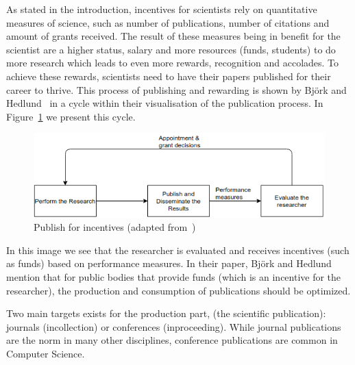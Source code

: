 \documentclass{ou-report}
\newcommand{\todo}[1]{{\color{red} TODO: #1}}
\begin{document}
As stated in the introduction, incentives for scientists rely on quantitative 
measures of science, such as 
number of publications, number of citations and amount of grants received. The
result of these measures being in benefit for the scientist are a higher status, 
salary and more resources (funds, students) to do 
more research which leads to even more rewards, recognition and accolades. To 
achieve these rewards, scientists need to have their papers published for their 
career to thrive. This process of publishing and rewarding is shown by Bj\"ork 
and Hedlund~\cite{BH2004} in a cycle within their visualisation of the 
publication process. In Figure~\ref{fig:publish_incentives} we present this 
cycle.

\begin{figure}[H]
\centering
\includegraphics[width=12cm]{images/publication_process.drawio.png}
\caption{Publish for incentives (adapted from~\cite{BH2004})}
\label{fig:publish_incentives}
\end{figure}

In this image we see that the researcher is evaluated and receives incentives 
(such as funds) based on performance measures. In their paper,  Bj\"ork and 
Hedlund mention that for public bodies that provide funds (which is an incentive 
for the researcher), the production and consumption of publications should be 
optimized.
    


Two main targets exists for the production part, (the scientific publication): 
journals (incollection) or 
conferences (inproceeding). While journal publications are the norm in many 
other disciplines, conference publications are common in Computer Science.
\end{document}

